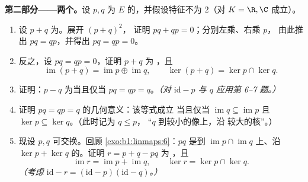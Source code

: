 \begin{problem}
\medskip
\noindent\textbf{第二部分——两个。}设 $p, q$ 为
$E$ 的，并假设特征不为 $2$（对
$K = \R, \C$ 成立）。
\begin{enumerate}[resume]
  \item 设 $p + q$ 为。展开 $(p + q)^2$，
        证明 $pq + qp = 0$；分别左乘、右乘 $p$，
        由此推出 $pq = qp$，并得出 $pq = qp =
        0$。
  \item 反之，设 $pq = qp = 0$，证明 $p + q$ 为
        ，且
        \[
        \operatorname{im}(p + q) = \operatorname{im} p \oplus
        \operatorname{im} q,
        \qquad
        \ker(p + q) = \ker p \cap \ker q .
        \]
  \item 证明：$p - q$ 为当且仅当 $pq = qp
        = q$。\emph{（对 $\mathrm{id} - p$
        与 $q$ 应用第 6--7 题。）}
  \item 证明 $pq = qp = q$ 的几何意义：该等式成立
        当且仅当 $\operatorname{im} q \subseteq
        \operatorname{im} p$ 且 $\ker p \subseteq \ker q$。（此时记为 $q \leq p$，
        “$q$ 到较小的像上，沿
        较大的核”。）
  \item 现设 $p, q$ 可交换。回顾
        \cref{exo:b1:linmaps:6}：$pq$ 是到
        $\operatorname{im} p \cap \operatorname{im} q$ 上、沿
        $\ker p + \ker q$ 的。证明 $r = p + q - pq$ 为
        ，且
        \[
        \operatorname{im} r = \operatorname{im} p +
        \operatorname{im} q,
        \qquad
        \ker r = \ker p \cap \ker q .
        \]
        \emph{（考虑 $\mathrm{id} - r = (\mathrm{id} -
        p)(\mathrm{id} - q)$。）}
\end{enumerate}


\end{problem}
